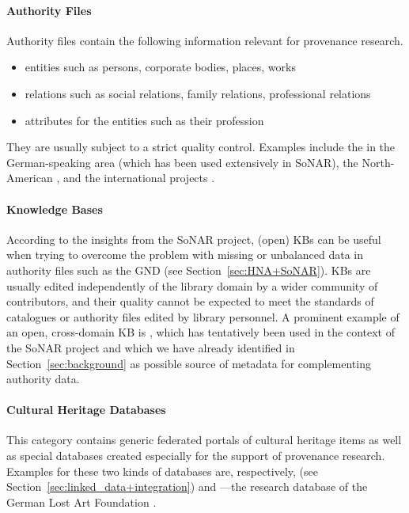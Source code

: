 \paragraph{Authority Files}
%
Authority files
contain the following information relevant for provenance research.
%
\begin{itemize}
  \item
    entities such as persons, corporate bodies, places, works
  \item
    relations such as social relations, family relations, professional relations
  \item
    attributes for the entities such as their profession
\end{itemize}
%
They are usually subject to a strict quality control.
Examples include the  \autocite{GND} in the German-speaking area (which has been used extensively in \gls{SoNAR}),
the North-American  \autocite{LCNAF},
and the international projects  \autocite{ISNI,VIAF}.

\paragraph{Knowledge Bases}

According to the insights from the \gls{SoNAR} project,
(open) \glspl{KB} can be useful when trying to overcome the problem with missing or unbalanced data
in authority files such as the \gls{GND} (see Section~\ref{sec:HNA+SoNAR}).
\Glspl{KB} are usually edited independently of the library domain by a wider community of contributors,
and their quality cannot be expected to meet the standards of catalogues or authority files edited by library personnel.
A prominent example of an open, cross-domain \gls{KB} is  \autocite{Wikidata},
which has tentatively been used in the context of the \gls{SoNAR} project
and which we have already identified in Section~\ref{sec:background} as possible source of metadata
for complementing authority data.

\paragraph{Cultural Heritage Databases}

This category contains generic federated portals of cultural heritage items
as well as special databases created especially for the support of provenance research.
Examples for these two kinds of databases are, respectively,  \autocite{Europeana} (see Section~\ref{sec:linked_data+integration})
and ---the research database of the German Lost Art Foundation \autocite{Proveana}.


